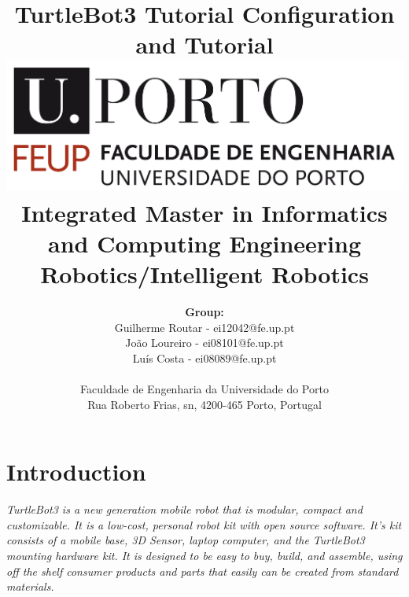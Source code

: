 \documentclass{article}
\begin{document}
\title{\Huge\textbf{TurtleBot3 Tutorial}\linebreak\linebreak\linebreak
\Large\textbf{Configuration and Tutorial }\linebreak\linebreak
\linebreak\linebreak
\includegraphics[scale=0.1]{feup-logo.png}\linebreak\linebreak
\linebreak\linebreak
\Large{Integrated Master in Informatics and Computing Engineering} \linebreak\linebreak
\Large{Robotics/Intelligent Robotics}\linebreak
}

\author{\textbf{Group:}\\
Guilherme Routar - ei12042@fe.up.pt \\
João Loureiro - ei08101@fe.up.pt \\
Luís Costa - ei08089@fe.up.pt \\
\linebreak\linebreak
 \\ Faculdade de Engenharia da Universidade do Porto \\ Rua Roberto Frias, s\/n, 4200-465 Porto, Portugal \linebreak\linebreak\linebreak
\linebreak\linebreak\vspace{1cm}}

\maketitle
 
 \section{Introduction}
 \textit{TurtleBot3 is a new generation mobile robot that is modular, compact and customizable. It is a low-cost, personal robot kit
 with open source software. It's kit consists of a mobile base, 3D Sensor, laptop computer, and the TurtleBot3 mounting hardware kit. It
 is designed to be easy to buy, build, and assemble, using off the shelf consumer products and parts that easily can be created from
 standard materials.}
 
\end{document}
